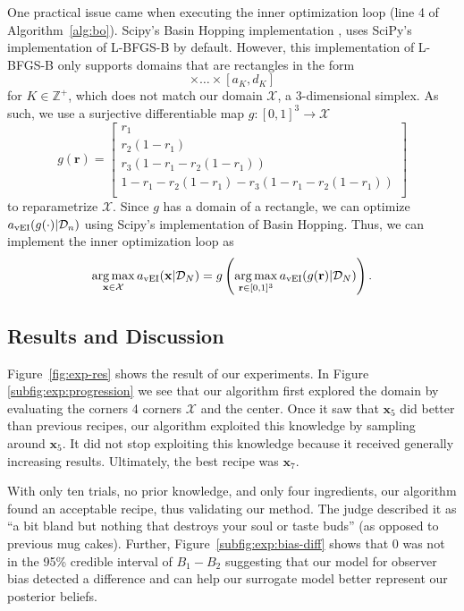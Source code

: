 One practical issue came when executing the inner optimization loop (line 4 of Algorithm~\ref{alg:bo}).
Scipy's Basin Hopping implementation \cite{scipy, wales1997}, uses SciPy's implementation of L-BFGS-B by default.
However, this implementation of L-BFGS-B only supports domains that are rectangles in the form
\begin{equation*}
    [a_1, d_1] \times \dots \times [a_K, d_K]
\end{equation*}
for $K \in \mathbb{Z}^{+}$,
which does not match our domain $\mathcal{X}$, a 3-dimensional simplex.
As such, we use a surjective differentiable map $g: [0, 1]^3 \to \mathcal{X}$
\begin{equation*}
    g(\mathbf{r}) =
    \begin{bmatrix}
        r_1 \\
        r_2(1 - r_1) \\
        r_3(1 - r_1 - r_2(1 - r_1)) \\
           1 - r_1 - r_2(1 - r_1) - r_3(1 - r_1 - r_2(1 - r_1)) \\
    \end{bmatrix}
\end{equation*}
to reparametrize $\mathcal{X}$.
Since $g$ has a domain of a rectangle, we can optimize $a_{\mathrm{vEI}}(g(\cdot) | \mathcal{D}_n)$ using Scipy's implementation of Basin Hopping.
Thus, we can implement the inner optimization loop as
\begin{equation*}
    \operatorname*{arg\,max}_{\mathbf{x} \in \mathcal{X}} a_{\mathrm{vEI}}(\mathbf{x} | \mathcal{D}_N)
    =
    g\left(\operatorname*{arg\,max}_{\mathbf{r} \in [0, 1]^3} a_{\mathrm{vEI}}(g(\mathbf{r}) | \mathcal{D}_N)\right).
\end{equation*}

\subsection{Results and Discussion}\label{ssec:results}

Figure~\ref{fig:exp-res} shows the result of our experiments.
In Figure \ref{subfig:exp:progression} we see that our algorithm first explored the domain by evaluating the corners 4 corners $\mathcal{X}$ and the center.
Once it saw that $\mathbf{x}_5$ did better than previous recipes, our algorithm exploited this knowledge by sampling around $\mathbf{x}_5$.
It did not stop exploiting this knowledge because it received generally increasing results.
Ultimately, the best recipe was $\mathbf{x}_7$.

With only ten trials, no prior knowledge, and only four ingredients,
our algorithm found an acceptable recipe, thus validating our method.
The judge described it as ``a bit bland but nothing that destroys your soul or taste buds'' (as opposed to previous mug cakes).
Further, Figure~\ref{subfig:exp:bias-diff} shows that 0 was not in the 95\% credible interval of $B_1 - B_2$
suggesting that our model for observer bias detected a difference and can help our surrogate model better represent our posterior beliefs.

